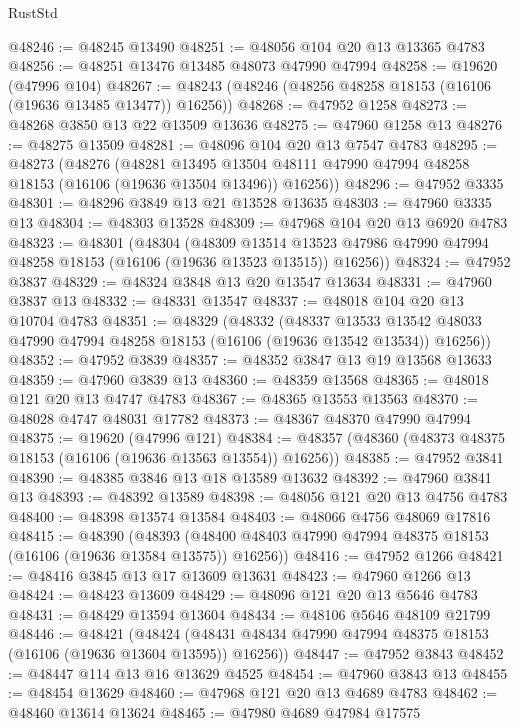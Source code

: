 \begin{lexlean}{RustStd}
\begin{coremodule}
@48246 := @48245 @13490
@48251 := @48056 @104 @20 @13 @13365 @4783
@48256 := @48251 @13476 @13485 @48073 @47990 @47994
@48258 := @19620 (@47996 @104)
@48267 := @48243 (@48246 (@48256 @48258 @18153 (@16106 (@19636 @13485 @13477)) @16256))
@48268 := @47952 @1258
@48273 := @48268 @3850 @13 @22 @13509 @13636
@48275 := @47960 @1258 @13
@48276 := @48275 @13509
@48281 := @48096 @104 @20 @13 @7547 @4783
@48295 := @48273
    (@48276
      (@48281
        @13495
        @13504
        @48111
        @47990
        @47994
        @48258
        @18153
        (@16106 (@19636 @13504 @13496))
        @16256))
@48296 := @47952 @3335
@48301 := @48296 @3849 @13 @21 @13528 @13635
@48303 := @47960 @3335 @13
@48304 := @48303 @13528
@48309 := @47968 @104 @20 @13 @6920 @4783
@48323 := @48301
    (@48304
      (@48309
        @13514
        @13523
        @47986
        @47990
        @47994
        @48258
        @18153
        (@16106 (@19636 @13523 @13515))
        @16256))
@48324 := @47952 @3837
@48329 := @48324 @3848 @13 @20 @13547 @13634
@48331 := @47960 @3837 @13
@48332 := @48331 @13547
@48337 := @48018 @104 @20 @13 @10704 @4783
@48351 := @48329
    (@48332
      (@48337
        @13533
        @13542
        @48033
        @47990
        @47994
        @48258
        @18153
        (@16106 (@19636 @13542 @13534))
        @16256))
@48352 := @47952 @3839
@48357 := @48352 @3847 @13 @19 @13568 @13633
@48359 := @47960 @3839 @13
@48360 := @48359 @13568
@48365 := @48018 @121 @20 @13 @4747 @4783
@48367 := @48365 @13553 @13563
@48370 := @48028 @4747 @48031 @17782
@48373 := @48367 @48370 @47990 @47994
@48375 := @19620 (@47996 @121)
@48384 := @48357 (@48360 (@48373 @48375 @18153 (@16106 (@19636 @13563 @13554)) @16256))
@48385 := @47952 @3841
@48390 := @48385 @3846 @13 @18 @13589 @13632
@48392 := @47960 @3841 @13
@48393 := @48392 @13589
@48398 := @48056 @121 @20 @13 @4756 @4783
@48400 := @48398 @13574 @13584
@48403 := @48066 @4756 @48069 @17816
@48415 := @48390
    (@48393 (@48400 @48403 @47990 @47994 @48375 @18153 (@16106 (@19636 @13584 @13575)) @16256))
@48416 := @47952 @1266
@48421 := @48416 @3845 @13 @17 @13609 @13631
@48423 := @47960 @1266 @13
@48424 := @48423 @13609
@48429 := @48096 @121 @20 @13 @5646 @4783
@48431 := @48429 @13594 @13604
@48434 := @48106 @5646 @48109 @21799
@48446 := @48421
    (@48424 (@48431 @48434 @47990 @47994 @48375 @18153 (@16106 (@19636 @13604 @13595)) @16256))
@48447 := @47952 @3843
@48452 := @48447 @114 @13 @16 @13629 @4525
@48454 := @47960 @3843 @13
@48455 := @48454 @13629
@48460 := @47968 @121 @20 @13 @4689 @4783
@48462 := @48460 @13614 @13624
@48465 := @47980 @4689 @47984 @17575

\end{coremodule}
\end{lexlean}
